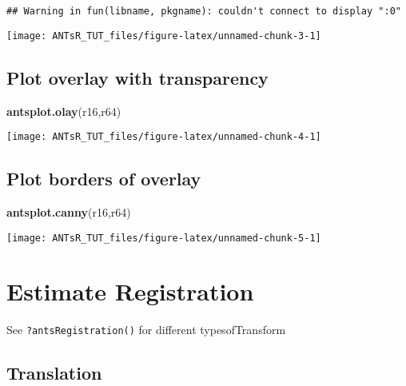\documentclass[]{tufte-handout}
\newenvironment{Shaded}{}{}
\newcommand{\DataTypeTok}[1]{\textcolor[rgb]{0.56,0.13,0.00}{#1}}
\newcommand{\KeywordTok}[1]{\textcolor[rgb]{0.00,0.44,0.13}{\textbf{#1}}}
\newcommand{\NormalTok}[1]{#1}
\newcommand{\OperatorTok}[1]{\textcolor[rgb]{0.40,0.40,0.40}{#1}}
\newcommand{\StringTok}[1]{\textcolor[rgb]{0.25,0.44,0.63}{#1}}
\begin{document}
\begin{verbatim}
## Warning in fun(libname, pkgname): couldn't connect to display ":0"
\end{verbatim}

\texttt{[image: ANTsR\_TUT\_files/figure-latex/unnamed-chunk-3-1]}

\hypertarget{plot-overlay-with-transparency}{%
\subsection{Plot overlay with
transparency}\label{plot-overlay-with-transparency}}

\begin{Shaded}
\begin{Highlighting}[]
\KeywordTok{antsplot.olay}\NormalTok{(r16,r64)}
\end{Highlighting}
\end{Shaded}

\texttt{[image: ANTsR\_TUT\_files/figure-latex/unnamed-chunk-4-1]}

\hypertarget{plot-borders-of-overlay}{%
\subsection{Plot borders of overlay}\label{plot-borders-of-overlay}}

\begin{Shaded}
\begin{Highlighting}[]
\KeywordTok{antsplot.canny}\NormalTok{(r16,r64)}
\end{Highlighting}
\end{Shaded}

\texttt{[image: ANTsR\_TUT\_files/figure-latex/unnamed-chunk-5-1]}

\hypertarget{estimate-registration}{%
\section{Estimate Registration}\label{estimate-registration}}

See \texttt{?antsRegistration()} for different typesofTransform

\hypertarget{translation}{%
\subsection{Translation}\label{translation}}

\begin{Shaded}
\end{Shaded}
\end{document}
